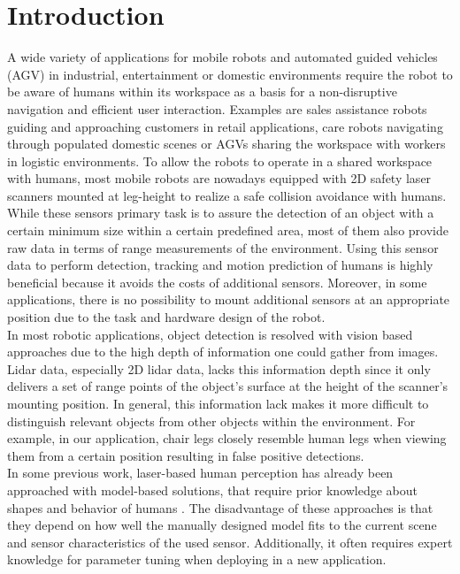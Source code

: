 \section{Introduction}

A wide variety of applications for mobile robots and automated guided vehicles (AGV) in industrial, entertainment or domestic environments require the robot to be aware of humans within its workspace as a basis for a non-disruptive navigation and efficient user interaction.
Examples are sales assistance robots guiding and approaching customers in retail applications, care robots navigating through populated domestic scenes or AGVs sharing the workspace with workers in logistic environments.
To allow the robots to operate in a shared workspace with humans, most mobile robots are nowadays equipped with 2D safety laser scanners mounted at leg-height to realize a safe collision avoidance with humans.
While these sensors primary task is to assure the detection of an object with a certain minimum size within a certain predefined area, most of them also provide raw data in terms of range measurements of the environment.
Using this sensor data to perform detection, tracking and motion prediction of humans is highly beneficial because it avoids the costs of additional sensors.
Moreover, in some applications, there is no possibility to mount additional sensors at an appropriate position due to the task and hardware design of the robot.\\
In most robotic applications, object detection is resolved with vision based approaches due to the high depth of information one could gather from images.
Lidar data, especially 2D lidar data, lacks this information depth since it only delivers a set of range points of the object's surface at the height of the scanner's mounting position.
In general, this information lack makes it more difficult to distinguish relevant objects from other objects within the environment.
For example, in our application, chair legs closely resemble human legs when viewing them from a certain position resulting in false positive detections.\\
In some previous work, laser-based human perception has already been approached with model-based solutions, that require prior knowledge about shapes and behavior of humans \cite{Arras07usingboosted} \cite{weinrich2014people}.
The disadvantage of these approaches is that they depend on how well the manually designed model fits to the current scene and sensor characteristics of the used sensor.
Additionally, it often requires expert knowledge for parameter tuning when deploying in a new application.\\
